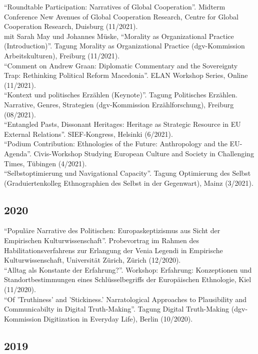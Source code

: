 \enquote{Roundtable Participation: Narratives of Global Cooperation}. Midterm Conference New Avenues of Global Cooperation Research, Centre for Global Cooperation Research, Duisburg (11/2021).\\[.25cm]mit Sarah May und Johannes Müske, \enquote{Morality as Organizational Practice (Introduction)}. Tagung Morality as Organizational Practice (dgv-Kommission Arbeitskulturen), Freiburg (11/2021).\\[.25cm]\enquote{Comment on Andrew Graan: Diplomatic Commentary and the Sovereignty Trap: Rethinking Political Reform Macedonia}. ELAN Workshop Series, Online (11/2021).\\[.25cm]\enquote{Kontext und politisches Erzählen (Keynote)}. Tagung Politisches Erzählen. Narrative, Genres, Strategien (dgv-Kommission Erzählforschung), Freiburg (08/2021).\\[.25cm]\enquote{Entangled Pasts, Dissonant Heritages: Heritage as Strategic Resource in EU External Relations}. SIEF-Kongress, Helsinki (6/2021).\\[.25cm]\enquote{Podium Contribution: Ethnologies of the Future: Anthropology and the EU-Agenda}. Civis-Workshop Studying European Culture and Society in Challenging Times, Tübingen (4/2021).\\[.25cm]\enquote{Selbstoptimierung und Navigational Capacity}. Tagung Optimierung des Selbst (Graduiertenkolleg Ethnographien des Selbst in der Gegenwart), Mainz (3/2021).\subsection*{2020}
\enquote{Populäre Narrative des Politischen: Europaskeptizismus aus Sicht der Empirischen Kulturwissenschaft}. Probevortrag im Rahmen des Habilitationsverfahrens zur Erlangung der Venia Legendi in Empirische Kulturwissenschaft, Universität Zürich, Zürich (12/2020).\\[.25cm]\enquote{Alltag als Konstante der Erfahrung?}. Workshop: Erfahrung: Konzeptionen und Standortbestimmungen eines Schlüsselbegriffs der Europäischen Ethnologie, Kiel (11/2020).\\[.25cm]\enquote{Of 'Truthiness' and 'Stickiness.' Narratological Approaches to Plausibility and Communicabilty in Digital Truth-Making}. Tagung Digital Truth-Making (dgv-Kommission Digitization in Everyday Life), Berlin (10/2020).\subsection*{2019}
